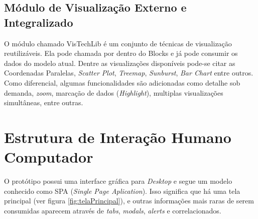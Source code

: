 \documentclass[
	12pt,				%
	openright,			%
	twoside,			%
	a4paper,			%
	english,			%
	brazil				%
	]{abntex2}
\begin{document}
		\subsection{Módulo de Visualização Externo e Integralizado}
		O módulo chamado VisTechLib é um conjunto de técnicas de visualização reutilizáveis.
		Ela pode chamada por dentro do Blocks e já pode consumir os dados do modelo atual.
		Dentre as visualizações disponíveis pode-se citar as Coordenadas Paralelas, \emph{Scatter Plot}, \emph{Treemap}, \emph{Sunburst}, \emph{Bar Chart} entre outros.
		Como diferencial, algumas funcionalidades são adicionadas como detalhe sob demanda, \emph{zoom}, marcação de dados (\emph{Highlight}), multiplas visualizações simultâneas, entre outras.
	\section{Estrutura de Interação Humano Computador}
		O protótipo possui uma interface gráfica para \emph{Desktop} e segue um modelo conhecido como SPA (\emph{Single Page Aplication}).
		Isso significa que há uma tela principal (ver figura \ref{fig:telaPrincipal}), e outras informações mais raras de serem consumidas aparecem através de \emph{tabs}, \emph{modals}, \emph{alerts} e correlacionados.
\end{document}
